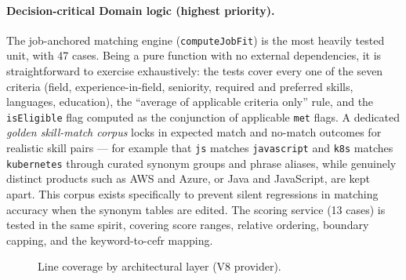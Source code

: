 \paragraph{Decision-critical Domain logic (highest priority).}
The job-anchored matching engine (\texttt{computeJobFit}) is the most
heavily tested unit, with 47 cases. Being a pure function with no external
dependencies, it is straightforward to exercise exhaustively: the tests cover
every one of the seven criteria
(field, experience-in-field, seniority, required and preferred skills,
languages, education), the ``average of applicable criteria only'' rule,
and the \texttt{isEligible} flag computed as the conjunction of applicable
\texttt{met} flags. A dedicated \textit{golden skill-match corpus} locks in
expected match and no-match outcomes for realistic skill pairs --- for
example that \texttt{js} matches \texttt{javascript} and \texttt{k8s}
matches \texttt{kubernetes} through curated synonym groups and phrase
aliases, while genuinely distinct products such as AWS and Azure, or Java
and JavaScript, are kept apart. This corpus exists specifically to prevent
silent regressions in matching accuracy when the synonym tables are edited.
The scoring service (13 cases) is tested in the same spirit, covering score
ranges, relative ordering, boundary capping, and the keyword-to-\gls{cefr}
mapping.

\begin{figure}[ht]
\centering
{}
\caption[Line coverage by architectural layer]{Line coverage by architectural
layer (V8 provider).}
\label{fig:coverage-by-layer}
\end{figure}

